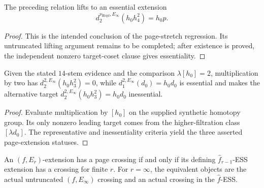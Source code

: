 \begin{proposition}
  \label{prop:hopf-einfty-page-extension}
  \notready
  The preceding relation lifts to an essential extension
  \[
    d_2^{\nu_{\mathrm{Hopf}},E_\infty}(h_0h_4^2)=h_0p.
  \]
\end{proposition}

\begin{proof}
  This is the intended conclusion of the page-stretch regression.
  Its untruncated lifting argument remains to be completed; after existence
  is proved, the independent nonzero target-coset clause gives essentiality.
\end{proof}

\begin{proposition}
  \label{prop:two-page-extension-regression}
  \notready
  Given the stated $14$-stem evidence and the comparison
  $\lambda[h_0]=2$, multiplication by two has
  $d_2^{2,E_\infty}(h_0h_3^2)=0$, while
  $d_1^{2,E_\infty}(d_0)=h_0d_0$ is essential and makes the alternative target
  $d_2^{2,E_\infty}(h_0h_3^2)=h_0d_0$ inessential.
\end{proposition}

\begin{proof}
  Evaluate multiplication by $[h_0]$ on the supplied synthetic homotopy group.
  Its only nonzero leading target comes from the higher-filtration class
  $[\lambda d_0]$.  The representative and inessentiality criteria yield the
  three asserted page-extension statuses.
\end{proof}

\begin{proposition}
  \label{prop:page-crossing-iff-synthetic-crossing}
  \notready
  An $(f,E_r)$-extension has a page crossing if and only if its defining
  $\widehat f_{r-1}$-ESS extension has a crossing for finite $r$.  For
  $r=\infty$, the equivalent objects are the actual untruncated
  $(f,E_\infty)$ crossing and an actual crossing in the $\widehat f$-ESS.
\end{proposition}


